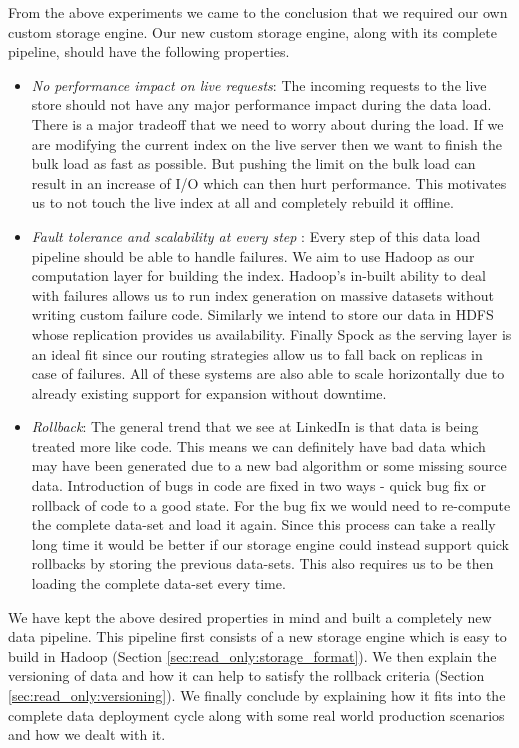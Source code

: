 \documentclass[twocolumn]{article}
\newcommand{\projectname}{Spock}
\begin{document}
From the above experiments we came to the conclusion that we required our own custom storage engine. Our new custom storage engine, along with its complete pipeline, should have the following properties. 
\begin{itemize}
\item \emph {No performance impact on live requests}: The incoming requests to the live store should not have any major performance impact during the data load. There is a major tradeoff that we need to worry about during the load. If we are modifying the current index on the live server then we want to finish the bulk load as fast as possible. But pushing the limit on the bulk load can result in an increase of I/O which can then hurt performance. This motivates us to not touch the live index at all and completely rebuild it offline. 
\item \emph {Fault tolerance and scalability at every step }: Every step of this data load pipeline should be able to handle failures. We aim to use Hadoop as our computation layer for building the index. Hadoop's in-built ability to deal with failures allows us to run index generation on massive datasets without writing custom failure code. Similarly we intend to store our data in HDFS whose replication provides us availability. Finally \projectname{} as the serving layer is an ideal fit since our routing strategies allow us to fall back on replicas in case of failures. All of these systems are also able to scale horizontally due to already existing support for expansion without downtime. 
\item \emph{Rollback}: The general trend that we see at LinkedIn is that data is being treated more like code. This means we can definitely have bad data which may have been generated due to a new bad algorithm or some missing source data. Introduction of bugs in code are fixed in two ways - quick bug fix or rollback of code to a good state. For the bug fix we would need to re-compute the complete data-set and load it again. Since this process can take a really long time it would be better if our storage engine could instead support quick rollbacks by storing the previous data-sets. This also requires us to be then loading the complete data-set every time. 
\end{itemize}

We have kept the above desired properties in mind and built a completely new data pipeline. This pipeline first consists of a new storage engine which is easy to build in Hadoop (Section \ref{sec:read_only:storage_format}). We then explain the versioning of data and how it can help to satisfy the rollback criteria (Section \ref{sec:read_only:versioning}). We finally conclude by explaining how it fits into the complete data deployment cycle along with some real world production scenarios and how we dealt with it. 
\end{document}
